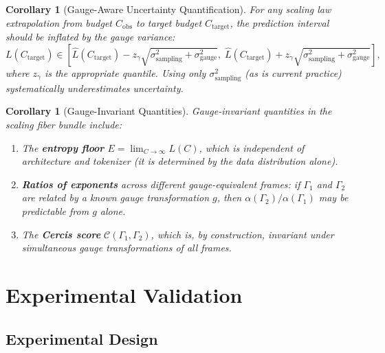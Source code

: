 \documentclass[12pt,a4paper]{article}
\newtheorem{corollary}[theorem]{Corollary}
\theoremstyle{remark}
\newcommand{\cercis}{\mathcal{C}}
\newcommand{\Loss}{L}
\begin{document}
\begin{corollary}[Gauge-Aware Uncertainty Quantification]
\label{cor:uq}
For any scaling law extrapolation from budget $C_{\text{obs}}$ to target budget $C_{\text{target}}$, the prediction interval should be inflated by the gauge variance:
\begin{equation}
\Loss(C_{\text{target}}) \in \left[\hat{\Loss}(C_{\text{target}}) - z_{\gamma} \sqrt{\sigma^2_{\text{sampling}} + \sigma^2_{\text{gauge}}},\;
\hat{\Loss}(C_{\text{target}}) + z_{\gamma} \sqrt{\sigma^2_{\text{sampling}} + \sigma^2_{\text{gauge}}}\right],
\end{equation}
where $z_{\gamma}$ is the appropriate quantile. Using only $\sigma^2_{\text{sampling}}$ (as is current practice) systematically underestimates uncertainty.
\end{corollary}

\begin{corollary}[Gauge-Invariant Quantities]
\label{cor:invariant}
Gauge-invariant quantities in the scaling fiber bundle include:
\begin{enumerate}[label=(\roman*)]
    \item The \textbf{entropy floor} $E = \lim_{C \to \infty} \Loss(C)$, which is independent of architecture and tokenizer (it is determined by the data distribution alone).
    \item \textbf{Ratios of exponents} across different gauge-equivalent frames: if $\Gamma_1$ and $\Gamma_2$ are related by a known gauge transformation $g$, then $\alpha(\Gamma_2)/\alpha(\Gamma_1)$ may be predictable from $g$ alone.
    \item The \textbf{Cercis score} $\cercis(\Gamma_1, \Gamma_2)$, which is, by construction, invariant under simultaneous gauge transformations of all frames.
\end{enumerate}
\end{corollary}

\section{Experimental Validation}
\label{sec:experiments}

\subsection{Experimental Design}
\end{document}

